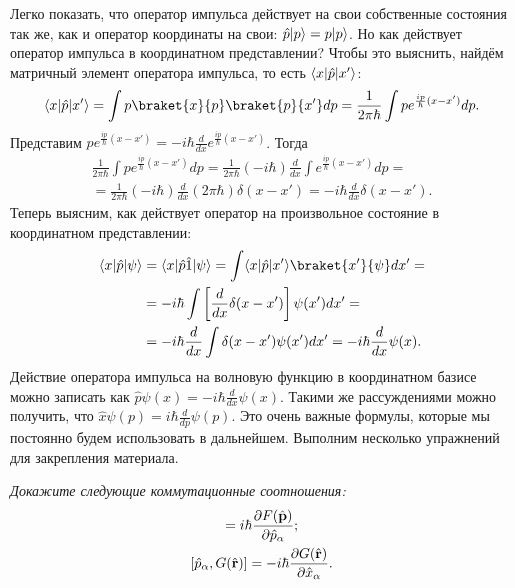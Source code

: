 Легко показать, что оператор импульса действует на свои собственные состояния
так же, как и оператор координаты на свои: $\hat{p} \lvert p\rangle=p \lvert p\rangle$. Но как
действует оператор импульса в координатном представлении? Чтобы это выяснить,
найдём матричный элемент оператора импульса, то есть $\langle x\rvert \hat{p}
  \lvert x'\rangle$:
\[
  \bra{x} \hat{p} \ket{x'} = \int p \braket{x}{p} \braket{p}{x'} dp =
  \frac{1}{2 \pi \hbar} \int p e^{\frac{i p}{\hbar}(x - x')} dp.
\]
Представим $p e^{\frac{i p}{\hbar}(x - x')} = -i \hbar \frac{d}{dx} e^{\frac{i
        p}{\hbar}(x - x')}$. Тогда
\begin{gather*}
  \frac{1}{2 \pi \hbar} \int p e^{\frac{i p}{\hbar}(x - x')} dp =
  \frac{1}{2 \pi \hbar}(-i \hbar) \frac{d}{dx} \int e^{\frac{i p}{\hbar}(x - x')} dp = \\
  = \frac{1}{2 \pi \hbar}(-i \hbar)\frac{d}{dx}(2 \pi \hbar)\delta(x - x') = -i \hbar
  \frac{d}{dx} \delta(x - x').
\end{gather*}
Теперь выясним, как действует оператор на произвольное состояние в координатном
представлении:
\begin{align*}
  \bra{x} \hat{p} \ket{\psi} &= \bra{x} \hat{p} \hat{1} \ket{\psi} =
  \int \bra{x} \hat{p} \ket{x'} \braket{x'} {\psi} dx' = \\
  &= -i \hbar \int \left[\frac{d}{dx} \delta(x - x')\right] \psi(x') dx' = \\
  &= -i\hbar\frac{d}{dx}\int\delta(x-x')\psi(x')dx' = -i \hbar \frac{d}{dx} \psi(x).
\end{align*}
Действие оператора импульса на волновую функцию в координатном базисе можно
записать как $\hat{p} \psi(x) = -i \hbar \frac{d}{dx} \psi(x)$. Такими же
рассуждениями можно получить, что $\hat{x} \psi(p) = i \hbar \frac{d}{dp}
  \psi(p)$. Это очень важные формулы, которые мы постоянно будем использовать в
дальнейшем. Выполним несколько упражнений для закрепления материала.
\begin{exercise}\label{ex:commutator-function}
  \textit{Докажите следующие коммутационные соотношения:}
  \begin{gather*}
    [\hat x_{\alpha}, F(\hat{\mathbf p})] = i \hbar \pd{F(\hat{\mathbf p})}{\hat p_{\alpha}}; \\
    [\hat p_{\alpha}, G(\hat{\mathbf r})] = -i \hbar \pd{G(\hat{\mathbf r})}{\hat x_{\alpha}}.
  \end{gather*}
\end{exercise}

